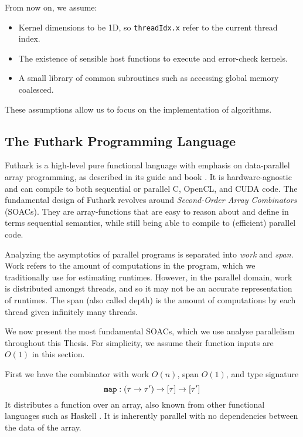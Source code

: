 From now on, we assume:
\begin{itemize}
  \renewcommand\labelitemi{--}
\item Kernel dimensions to be 1D, so \texttt{threadIdx.x} refer to the current thread index.
  \item The existence of sensible host functions to execute and error-check kernels.
  \item A small library of common subroutines such as accessing global memory coalesced.
\end{itemize}
These assumptions allow us to focus on the implementation of algorithms.

\subsection{The Futhark Programming Language}
\label{subsec:futhark}

Futhark is a high-level pure functional language with emphasis on data-parallel
array programming, as described in its guide and book
\cite{futguide,ParallelProgrammingInFuthark}. It is hardware-agnostic and can
compile to both sequential or parallel C, OpenCL, and CUDA code. The fundamental
design of Futhark revolves around \textit{Second-Order Array Combinators}
(SOACs). They are array-functions that are easy to reason about and define in
terms sequential semantics, while still being able to compile to (efficient)
parallel code.

Analyzing the asymptotics of parallel programs is separated into \textit{work}
and \textit{span}. Work refers to the amount of computations in the program,
which we traditionally use for estimating runtimes. However, in the parallel
domain, work is distributed amongst threads, and so it may not be an accurate
representation of runtimes. The span (also called depth) is the amount of
computations by each thread given infinitely many threads.

We now present the most fundamental SOACs, which we use analyse parallelism
throughout this Thesis. For simplicity, we assume their function inputs are
$O(1)$ in this section.

First we have the combinator  with work $O(n)$, span $O(1)$, and type
signature
\begin{equation}
\mathtt{map}:(\tau \to \tau') \to \mathtt{[}\tau\mathtt{]} \to \mathtt{[}\tau'\mathtt{]}
\end{equation}
It distributes a function over an array, also known from other functional
languages such as Haskell \cite{marlow2010haskell}. It is inherently parallel
with no dependencies between the data of the array.

